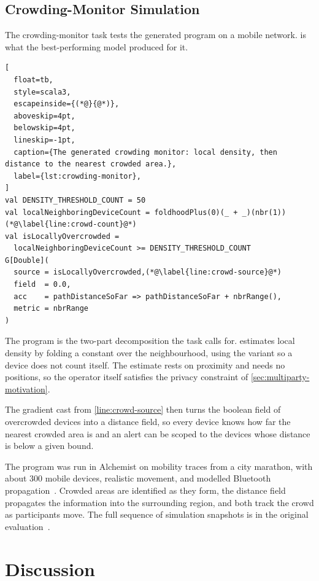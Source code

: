 \subsection{Crowding-Monitor Simulation}
\label{subsec:llm-case-study}

The crowding-monitor task tests the generated program on a mobile network.
%
 is what the best-performing model produced for it.

\begin{lstlisting}[
  float=tb,
  style=scala3,
  escapeinside={(*@}{@*)},
  aboveskip=4pt,
  belowskip=4pt,
  lineskip=-1pt,
  caption={The generated crowding monitor: local density, then distance to the nearest crowded area.},
  label={lst:crowding-monitor},
]
val DENSITY_THRESHOLD_COUNT = 50
val localNeighboringDeviceCount = foldhoodPlus(0)(_ + _)(nbr(1))(*@\label{line:crowd-count}@*)
val isLocallyOvercrowded =
  localNeighboringDeviceCount >= DENSITY_THRESHOLD_COUNT
G[Double](
  source = isLocallyOvercrowded,(*@\label{line:crowd-source}@*)
  field  = 0.0,
  acc    = pathDistanceSoFar => pathDistanceSoFar + nbrRange(),
  metric = nbrRange
)
\end{lstlisting}

\begingroup
{}
The program is the two-part decomposition the task calls for.
%
 estimates local density by folding a constant over the neighbourhood,
using the  variant so a device does not count itself.
%
The estimate rests on proximity and needs no positions,
so the operator itself satisfies the privacy constraint of \cref{sec:multiparty-motivation}.
\par
\endgroup
%
The gradient cast from \cref{line:crowd-source} then turns the boolean field of overcrowded devices into a distance field,
so every device knows how far the nearest crowded area is
and an alert can be scoped to the devices whose distance is below a given bound.

The program was run in Alchemist on mobility traces from a city marathon,
with about 300 mobile devices, realistic movement, and modelled Bluetooth propagation~\cite{DBLP:journals/computer/BealPV15}.
%
Crowded areas are identified as they form,
the distance field propagates the information into the surrounding region,
and both track the crowd as participants move.
%
The full sequence of simulation snapshots is in the original evaluation~\cite{DBLP:journals/tiot/AguzziFV25}.

\section{Discussion}
\label{sec:llm-macroprogramming-discussion}

